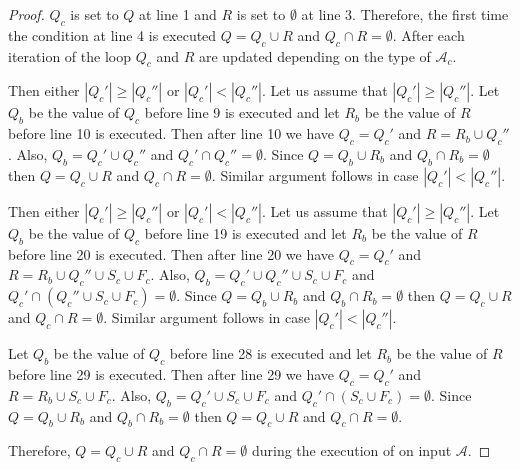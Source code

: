 \begin{proof}
  $Q_c$ is set to $Q$ at line 1 and $R$ is set to $\emptyset$ at line 3.
  Therefore, the first time the condition at line 4 is executed $Q = Q_c \cup
    R$ and $Q_c \cap R = \emptyset$. After each iteration of the loop $Q_c$ and
  $R$ are updated depending on the type of $\mathcal{A}_c$.

  \begin{case}
    Then either $|Q_c'| \geq |Q_c''|$ or $|Q_c'| < |Q_c''|$. Let us
    assume that $|Q_c'| \geq |Q_c''|$. Let $Q_b$ be the value of $Q_c$
    before line 9 is executed and let $R_b$ be the value of $R$ before
    line 10 is executed. Then after line 10 we have $Q_c = Q_c'$ and $R
      = R_b \cup Q_c''$. Also, $Q_b = Q_c' \cup Q_c''$ and $Q_c' \cap
      Q_c'' = \emptyset$. Since $Q = Q_b \cup R_b$ and $Q_b \cap R_b =
      \emptyset$ then $Q = Q_c \cup R$ and $Q_c \cap R = \emptyset$.
    Similar argument follows in case $|Q_c'| < |Q_c''|$.
  \end{case}

  \begin{case}
    Then either $|Q_c'| \geq |Q_c''|$ or $|Q_c'| < |Q_c''|$. Let us
    assume that $|Q_c'| \geq |Q_c''|$. Let $Q_b$ be the value of $Q_c$
    before line 19 is executed and let $R_b$ be the value of $R$ before
    line 20 is executed. Then after line 20 we have $Q_c = Q_c'$ and $R
      = R_b \cup Q_c'' \cup S_c \cup F_c$. Also, $Q_b = Q_c' \cup Q_c''
      \cup S_c \cup F_c$ and $Q_c' \cap (Q_c'' \cup S_c \cup F_c) =
      \emptyset$. Since $Q = Q_b \cup R_b$ and $Q_b \cap R_b = \emptyset$
    then $Q = Q_c \cup R$ and $Q_c \cap R = \emptyset$. Similar argument
    follows in case $|Q_c'| < |Q_c''|$.
  \end{case}

  \begin{case}
    Let $Q_b$ be the value of $Q_c$ before line 28 is executed and let
    $R_b$ be the value of $R$ before line 29 is executed. Then after
    line 29 we have $Q_c = Q_c'$ and $R = R_b \cup S_c \cup F_c$. Also,
    $Q_b = Q_c' \cup S_c \cup F_c$ and $Q_c' \cap (S_c \cup F_c) =
      \emptyset$. Since $Q = Q_b \cup R_b$ and $Q_b \cap R_b = \emptyset$
    then $Q = Q_c \cup R$ and $Q_c \cap R = \emptyset$.
  \end{case}

  \noindent
  Therefore, $Q = Q_c \cup R$ and $Q_c \cap R = \emptyset$ during the
  execution of  on input $\mathcal{A}$.
\end{proof}

